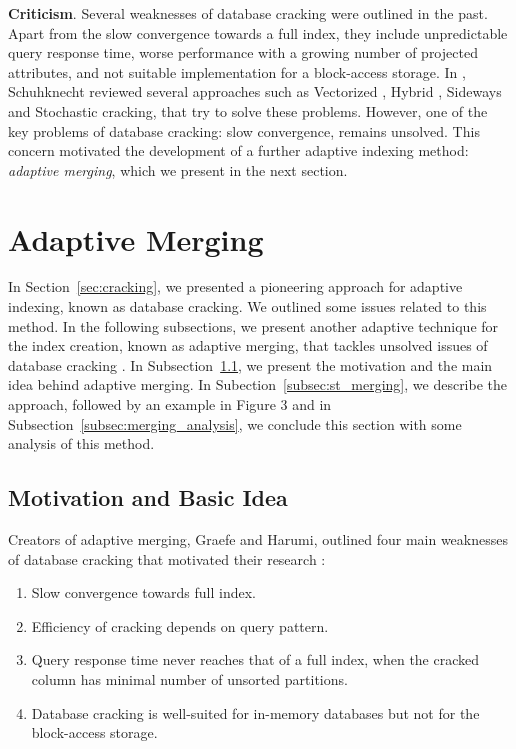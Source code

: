 \documentclass[10pt, conference, compsocconf]{IEEEtran}
\begin{document}
\textbf{Criticism}. Several weaknesses of database cracking were outlined in the past. Apart from the slow convergence towards a full index, they include unpredictable query response time, worse performance with a growing number of projected attributes, and not suitable implementation for a block-access storage. In \cite{survey_cracking}, Schuhknecht reviewed several approaches such as Vectorized \cite{eval1}, Hybrid \cite{hybrid}, Sideways \cite{sideway} and Stochastic \cite{stochastic} cracking, that try to solve these problems. However, one of the key problems of database cracking: slow convergence, remains unsolved. This concern motivated the development of a further adaptive indexing method: \emph{adaptive merging}, which we present in the next section.

\section{Adaptive Merging}
\label{sec:merging}
In Section~\ref{sec:cracking}, we presented a pioneering approach for adaptive indexing, known as database cracking. We outlined some issues related to this method. In the following subsections, we present another adaptive technique for the index creation, known as adaptive merging, that tackles unsolved issues of database cracking \cite{merging}. In Subsection~\ref{subsec:merging_idea}, we present the motivation and the main idea behind adaptive merging. In Subection~\ref{subsec:st_merging}, we describe the approach, followed by an example in Figure 3 and in Subsection~\ref{subsec:merging_analysis}, we conclude this section with some analysis of this method.

\subsection{Motivation and Basic Idea}
\label{subsec:merging_idea}
Creators of adaptive merging, Graefe and Harumi, outlined four main weaknesses of database cracking that motivated their research \cite{merging}:
\begin{enumerate}
\item{Slow convergence towards full index.}
\item{Efficiency of cracking depends on query pattern.}
\item{Query response time never reaches that of a full index, when the cracked column has minimal number of unsorted partitions.}
\item{Database cracking is well-suited for in-memory databases but not for the block-access storage.}
\end{enumerate}
\end{document}
